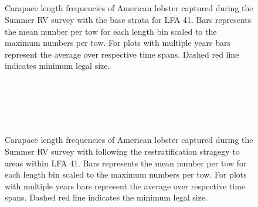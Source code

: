 \documentclass[11pt]{article}
\newcommand{\D}{.}
\newcommand{\e}{/backup/bio_data/bio.lobster/figures/} %
\begin{document}
\begin{figure}
\centering

\\
\\
\\
\\
 \caption{Carapace length frequencies of American lobster captured during the Summer RV survey with the base strata for LFA 41. Bars represents the mean number per tow for each length bin scaled to the maximum numbers per tow. For plots with multiple years bars represent the average over respective time spans. Dashed red line indicates minimum legal size.}
\end{figure}
\clearpage

\begin{figure}
\centering

\\
\\
\\
\\
 \caption{Carapace length frequencies of American lobster captured during the Summer RV survey with following the restratification stragegy to areas within LFA 41. Bars represents the mean number per tow for each length bin scaled to the maximum numbers per tow. For plots with multiple years bars represent the average over respective time spans. Dashed red line indicates the minimum legal size.}
\end{figure}
\clearpage
\end{document}
